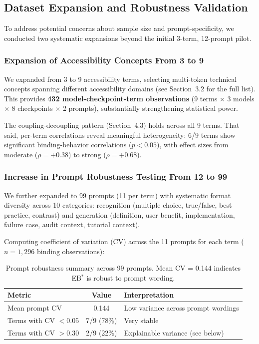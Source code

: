\documentclass[10pt]{article} %
\begin{document}
\subsection{Dataset Expansion and Robustness Validation}

To address potential concerns about sample size and prompt-specificity, we conducted two systematic expansions beyond the initial 3-term, 12-prompt pilot.

\subsubsection{Expansion of Accessibility Concepts From 3 to 9}

We expanded from 3 to 9 accessibility terms, selecting multi-token technical concepts spanning different accessibility domains (see Section~3.2 for the full list).
This provides \textbf{432 model-checkpoint-term observations} (9 terms $\times$ 3 models $\times$ 8 checkpoints $\times$ 2 prompts), substantially strengthening statistical power.

The coupling-decoupling pattern (Section~4.3) holds across all 9 terms.
That said, per-term correlations reveal meaningful heterogeneity: 6/9 terms show significant binding-behavior correlations ($p<0.05$), with effect sizes from moderate ($\rho=+0.38$) to strong ($\rho=+0.68$).

\subsubsection{Increase in Prompt Robustness Testing From 12 to 99}

We further expanded to 99 prompts (11 per term) with systematic format diversity across 10 categories: recognition (multiple choice, true/false, best practice, contrast) and generation (definition, user benefit, implementation, failure case, audit context, tutorial context).

Computing coefficient of variation (CV) across the 11 prompts for each term ($n=1{,}296$ binding observations):

\begin{table}[h]
\centering
\small
\begin{tabular}{|l|c|l|}
\hline
\textbf{Metric} & \textbf{Value} & \textbf{Interpretation} \\
\hline
Mean prompt CV & 0.144 & Low variance across prompt wordings \\
Terms with CV $<0.05$ & 7/9 (78\%) & Very stable \\
Terms with CV $>0.30$ & 2/9 (22\%) & Explainable variance (see below) \\
\hline
\end{tabular}
\caption{Prompt robustness summary across 99 prompts. Mean CV = 0.144 indicates EB$^*$ is robust to prompt wording.}
\label{tab:prompt_robustness}
\end{table}
\end{document}

